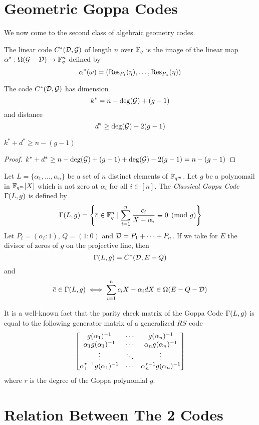 \section{Geometric Goppa Codes}
We now come to the second class of algebraic geometry codes. 
\begin{definition}
	The linear code $C^*(\mathcal{D},\mathcal{G})$ of length $n$ over $\mathbb{F}_q$ is the image of the linear map $\alpha^*:\Omega(\mathcal{G}-\mathcal{D})\to \mathbb{F}_q^n$ defined by $$\alpha^*(\omega)=(\operatorname{Res}_{P_1}(\eta), \dots, \operatorname{Res}_{P_n}(\eta))$$
\end{definition}
\begin{theorem}
	The code $C^*(\mathcal{D},\mathcal{G})$ has dimension $$k^*=n-\deg(\mathcal{G})+(g-1)$$ and distance $$d^*\geq \deg(\mathcal{G})-2(g-1)$$
\end{theorem}
\begin{corollary}
	$k^*+d^*\geq n-(g-1)$
\end{corollary}
\begin{proof}
	$k^*+d^*\geq n-\deg(\mathcal{G})+(g-1)+\deg(\mathcal{G})-2(g-1)=n-(g-1)$
\end{proof}
\begin{example}
	Let $L=\{\alpha_1,\dots,\alpha_n\}$ be a set of $n$ distinct elements of $\mathbb{F}_{q^m}$. Let $g$ be a polynomail in $\mathbb{F}_{q^m}[X]$ which is not zero at $\alpha_i$ for all $i\in [n]$. The \textit{Classical Goppa Code} $\Gamma(L,g)$ is defined by $$\Gamma(L,g)=\left\{\overline{c}\in \mathbb{F}_q^n\mid \sum_{i=1}^n\frac{c_i}{X-\alpha_i}\equiv 0 \pmod{g}\right\}$$Let $P_i=(\alpha_i:1)$, $Q=(1:0)$ and $\mathcal{D}=P_1+\dots+P_n$. If we take for $E$ the divisor of zeros of $g$ on the projective line, then $$\Gamma(L,g)=C^*(\mathcal{D}, E-Q)$$ and $$\overline{c}\in \Gamma(L,g)\iff \sum_{i=1}^n{c_i}{X-\alpha_i}dX\in \Omega(E-Q-\mathcal{D})$$
	
	It is a well-known fact that the parity check matrix of the Goppa Code $\Gamma(L,g)$ is equal to the following generator matrix of a generalized $RS$ code $$\left[\begin{matrix}g(\alpha_1)^{-1}  & \cdots & g(\alpha_n)^{-1}\\ \alpha_1g(\alpha_1)^{-1}  & \cdots & \alpha_ng(\alpha_n)^{-1}\\ \vdots & \ddots & \vdots \\ \alpha_1^{r-1}g(\alpha_1)^{-1}  & \cdots & \alpha_n^{r-1}g(\alpha_n)^{-1}\end{matrix}\right]$$where $r$ is the degree of the Goppa polynomial $g$.
\end{example}
\section{Relation Between The 2 Codes}